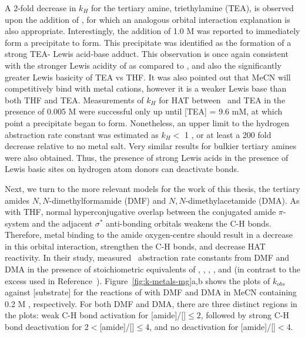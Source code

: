 A 2-fold decrease in $k_H$ for the tertiary amine, triethylamine (TEA), is observed upon the addition of , for which an analogous orbital interaction explanation is also appropriate. Interestingly, the addition of 1.0 M  was reported to immediately form a precipitate to form. This precipitate was identified as the formation of a strong TEA- Lewis acid-base adduct. This observation is once again consistent with the stronger Lewis acidity of  as compared to , and also the significantly greater Lewis basicity of TEA vs THF.\cite{Salamone2013a, Reichardt2010} It was also pointed out that MeCN will competitively bind with metal cations, however it is a weaker Lewis base than both THF and TEA. Measurements of $k_H$ for HAT between \cumo\ and TEA in the presence of 0.005 M  were successful only up until [TEA] = 9.6 mM, at which point a precipitate began to form. Nonetheless, an upper limit to the hydrogen abstraction rate constant was estimated as $k_H <$ 1 \Ms, or at least a 200 fold decrease relative to no metal salt. Very similar results for bulkier tertiary amines were also obtained. Thus, the presence of strong Lewis acids in the presence of Lewis basic sites on hydrogen atom donors can deactivate  bonds.

Next, we turn to the more relevant models for the work of this thesis, the tertiary amides $N,N$-dimethylformamide (DMF) and $N,N$-dimethylacetamide (DMA). As with THF, normal hyperconjugative overlap between the conjugated amide $\pi$-system and the adjacent  $\sigma^*$ anti-bonding orbitals weakens the C-H bonds. Therefore, metal binding to the amide oxygen-centre should result in a decrease in this orbital interaction, strengthen the C-H bonds, and decrease HAT reactivity. In their study, \citet{Salamone2015metals} measured \cumo\ abstraction rate constants from DMF and DMA in the presence of stoichiometric equivalents of , , , , and  (in contrast to the excess used in Reference~). Figure~\ref{fig:k-metals-mg}a,b shows the plots of $k_{obs}$ against [substrate] for the reactions of \cumo with DMF and DMA in MeCN containing 0.2 M , respectively. For both DMF and DMA, there are three distinct regions in the plots: weak C-H bond activation for [amide]/[]$\leq 2$, followed by strong C-H bond deactivation for 2$<$[amide]/[]$\leq$4, and no deactivation for [amide]/[]$<$4.

